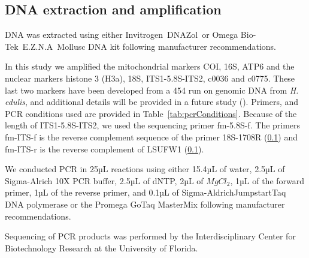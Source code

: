 \documentclass{article}
\begin{document}

\subsection{DNA extraction and amplification}

DNA was extracted using either Invitrogen\texttrademark\ DNAZol\textregistered\
or Omega Bio-Tek\texttrademark\ E.Z.N.A\textregistered\ Mollusc DNA kit following
manufacturer recommendations. 

In this study we amplified the mitochondrial markers COI, 16S, ATP6 and the
nuclear markers histone 3 (H3a), 18S, ITS1-5.8S-ITS2, c0036 and c0775. These
last two markers have been developed from a 454 run on genomic DNA from
\textit{H. edulis}, and additional details will be provided in a future study
(\cite{MichonneauInPrep}). Primers, and PCR conditions used are provided in
Table~\ref{tab:pcrConditions}. Because of the length of ITS1-5.8S-ITS2, we used
the sequencing primer fm-5.8S-f. The primers fm-ITS-f is the reverse complement
sequence of the primer 18S-1708R (\ref{}) and fm-ITS-r is the reverse complement
of LSUFW1 (\ref{}).

We conducted PCR in 25µL reactions using either 15.4µL of water, 2.5µL of
Sigma-Alrich \textregistered 10X PCR buffer, 2.5µL of dNTP, 2µL of $MgCl_2$, 1µL
of the forward primer, 1µL of the reverse primer, and 0.1µL of
Sigma-Aldrich\textregistered Jumpstart\texttrademark Taq DNA polymerase or the
Promega GoTaq MasterMix following manufacturer recommendations.

Sequencing of PCR products was performed by the Interdisciplinary Center for
Biotechnology Research at the University of Florida.
\end{document}
